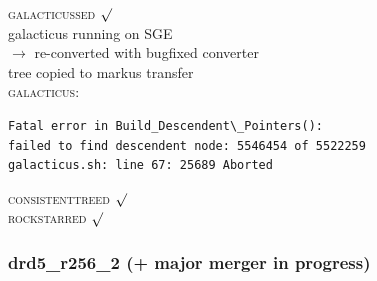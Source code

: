 \textsc{galacticussed} $\surd$  \\
galacticus running on SGE \\
$\rightarrow$ re-converted with bugfixed converter \\
tree copied to markus transfer \\
\textsc{galacticus}: 
\begin{verbatim}
Fatal error in Build_Descendent\_Pointers():
failed to find descendent node: 5546454 of 5522259
galacticus.sh: line 67: 25689 Aborted  
\end{verbatim}
\textsc{consistenttreed} $\surd$  \\ 
\textsc{rockstarred} $\surd$ \\ 

% 
%
%
%
%
%
%
%

\newpage
\subsubsection{drd5\_r256\_2 (+ major merger in progress)} 

